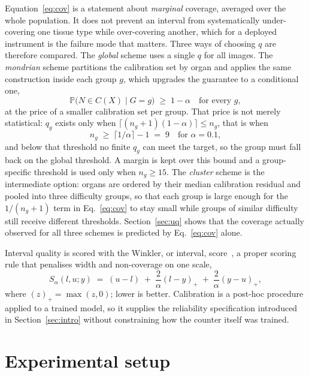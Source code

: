 \documentclass[preprint,12pt]{elsarticle}
\begin{document}
Equation~\eqref{eq:cov} is a statement about \emph{marginal} coverage, averaged over the whole population. It
does not prevent an interval from systematically under-covering one tissue type while over-covering another,
which for a deployed instrument is the failure mode that matters. Three ways of choosing $q$ are therefore
compared. The \emph{global} scheme uses a single $q$ for all images. The \emph{mondrian} scheme partitions the
calibration set by organ and applies the same construction inside each group $g$, which upgrades the guarantee
to a conditional one,
\begin{equation}
\mathbb{P}\big(N \in C(X) \mid G = g\big) \;\ge\; 1-\alpha \quad \text{for every } g,
\end{equation}
at the price of a smaller calibration set per group. That price is not merely statistical: $q_g$ exists only
when $\lceil (n_g+1)(1-\alpha)\rceil \le n_g$, that is when
\begin{equation}\label{eq:feas}
n_g \;\ge\; \lceil 1/\alpha \rceil - 1 \;=\; 9 \quad \text{for } \alpha = 0.1,
\end{equation}
and below that threshold no finite $q_g$ can meet the target, so the group must fall back on the global
threshold. A margin is kept over this bound and a group-specific threshold is used only when $n_g \ge 15$. The
\emph{cluster} scheme is the intermediate option: organs are ordered by their median calibration residual and
pooled into three difficulty groups, so that each group is large enough for the $1/(n_g+1)$ term in
Eq.~\eqref{eq:cov} to stay small while groups of similar difficulty still receive different thresholds.
Section~\ref{sec:uq} shows that the coverage actually observed for all three schemes is predicted by
Eq.~\eqref{eq:cov} alone.

Interval quality is scored with the Winkler, or interval, score~\cite{winkler}, a proper scoring rule that
penalises width and non-coverage on one scale,
\begin{equation}
S_\alpha(l,u;y) \;=\; (u-l) \;+\; \frac{2}{\alpha}(l-y)_{+} \;+\; \frac{2}{\alpha}(y-u)_{+},
\end{equation}
where $(z)_+ = \max(z,0)$; lower is better. Calibration is a post-hoc procedure applied to a trained model, so
it supplies the reliability specification introduced in Section~\ref{sec:intro} without constraining how the
counter itself was trained.

\section{Experimental setup}\label{sec:setup}
\end{document}
